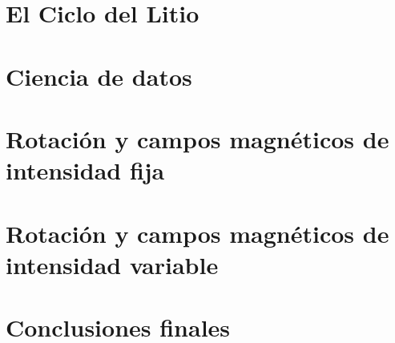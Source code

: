 \documentclass[print, color]{ugrTFG}
\begin{document}
\maketitle


\frontmatter %

   
            

                    
               

\mainmatter %

\part{El Ciclo del Litio} %



\cleardoublepage
\part{Ciencia de datos}




\cleardoublepage
\part{Rotación y campos magnéticos de intensidad fija} \label{parte1}



\cleardoublepage
\part{Rotación y campos magnéticos de intensidad variable} \label{parte2}



\cleardoublepage
\part{Conclusiones finales}

\end{document}
